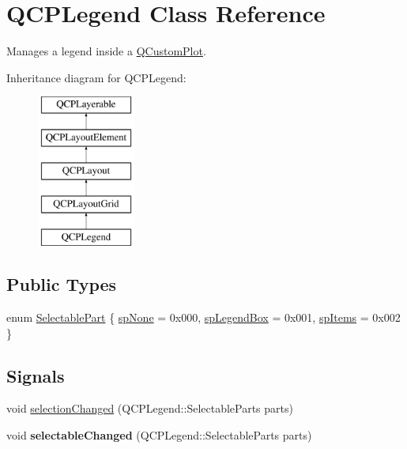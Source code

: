 \hypertarget{classQCPLegend}{\section{\-Q\-C\-P\-Legend \-Class \-Reference}
\label{classQCPLegend}
}


\-Manages a legend inside a \hyperlink{classQCustomPlot}{\-Q\-Custom\-Plot}.  


\-Inheritance diagram for \-Q\-C\-P\-Legend\-:\begin{figure}[H]
\begin{center}
\leavevmode
\includegraphics[height=5.000000cm]{classQCPLegend}
\end{center}
\end{figure}
\subsection*{\-Public \-Types}
\begin{DoxyCompactItemize}
\item 
enum \hyperlink{classQCPLegend_a5404de8bc1e4a994ca4ae69e2c7072f1}{\-Selectable\-Part} \{ \hyperlink{classQCPLegend_a5404de8bc1e4a994ca4ae69e2c7072f1a378201c07d500af7126e3ec91652eed7}{sp\-None} =  0x000, 
\hyperlink{classQCPLegend_a5404de8bc1e4a994ca4ae69e2c7072f1a0fa4758962a46fa1dc9da818abae23c4}{sp\-Legend\-Box} =  0x001, 
\hyperlink{classQCPLegend_a5404de8bc1e4a994ca4ae69e2c7072f1a768bfb95f323db4c66473375032c0af7}{sp\-Items} =  0x002
 \}
\end{DoxyCompactItemize}
\subsection*{\-Signals}
\begin{DoxyCompactItemize}
\item 
void \hyperlink{classQCPLegend_a82c88464edac07a9eefaf3906268df3b}{selection\-Changed} (\-Q\-C\-P\-Legend\-::\-Selectable\-Parts parts)
\item 
\hypertarget{classQCPLegend_a8a77300fd0976d6bdd8000f4e8d114b8}{void {\bfseries selectable\-Changed} (\-Q\-C\-P\-Legend\-::\-Selectable\-Parts parts)}\label{classQCPLegend_a8a77300fd0976d6bdd8000f4e8d114b8}

\end{DoxyCompactItemize}

